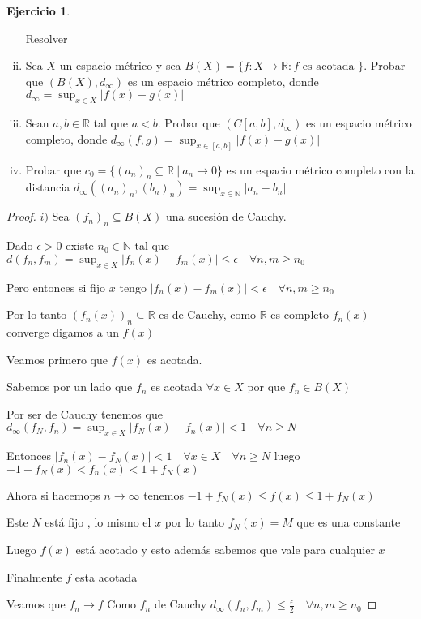 \documentclass[12pt]{article}
\newcommand{\R}{\mathbb{R}}
\newcommand{\N}{\mathbb{N}}
\newcommand{\ra}{\rightarrow}
\theoremstyle{definition}
\newtheorem{ej}{Ejercicio}
\begin{document}
\begin{ej}
  \begin{enumerate}[i.] Resolver
    \item Sea $X$ un espacio métrico y sea $B(X) = \{f: X \ra \R : f \text{ es acotada }\}$. Probar que $(B(X),d_{\infty})$ es un espacio métrico completo, donde $d_{\infty} = \sup_{x \in X} |f(x) - g(x)|$ 
    \item Sean $a,b \in \R$ tal que $a<b$. Probar que $(C[a,b],d_{\infty})$ es un espacio métrico completo, donde $d_{\infty}(f,g) = \sup_{x \in [a,b]} |f(x) - g(x)|$ 
    \item Probar que $c_0 = \{(a_n)_n \subseteq \R \ | \ a_n \ra 0\}$ es un espacio métrico completo con la distancia $d_{\infty}( (a_n)_n,(b_n)_n) = \sup_{x \in \N}|a_n -b_n| $
  \end{enumerate}
  \begin{proof}
  $i)$ Sea $(f_n)_n \subseteq B(X)$ una sucesión de Cauchy. 
 
  Dado $\epsilon >0 $ existe $n_0 \in \N$ tal que $d(f_n,f_m) =\sup_{x \in X} |f_n(x) - f_m(x)| \leq \epsilon \quad \forall n,m \geq n_0$ 

	  Pero entonces si fijo $x$ tengo $|f_n(x) - f_m(x)| < \epsilon \quad \forall n,m \geq n_0$ 

	  Por lo tanto $(f_n(x))_n \subseteq \R$ es de Cauchy, como $\R$ es completo $f_n(x)$ converge digamos a un $f(x)$

	  Veamos primero que $f(x)$ es acotada.

	  Sabemos por un lado que $f_n$ es acotada $\forall x \in X$ por que $f_n \in B(X)$

	  Por ser de Cauchy tenemos que $d_{\infty}(f_N,f_n)=\sup_{x \in X}|f_N(x) - f_n(x)| < 1 \quad \forall n \geq N$ 

	Entonces $|f_n(x) - f_N(x)| < 1 \quad \forall x \in X \quad \forall n \geq N $ luego $-1 +f_N(x) < f_n(x) < 1 +f_N(x)$

	  Ahora si hacemops $n \ra \infty$ tenemos $-1 + f_N(x) \leq f(x) \leq 1 + f_N(x)$

	  Este $N$ está fijo , lo mismo el $x$ por lo tanto $f_N(x) = M$ que es una constante

	  Luego $f(x)$ está acotado y esto además sabemos que vale para cualquier $x$  

	  Finalmente $f$ esta acotada

	  Veamos que $f_n \ra f$ Como $f_n$ de Cauchy $d_{\infty}(f_n,f_m) \leq \frac{\epsilon}{2} \quad \forall n,m \geq n_0$


\end{proof}
\end{ej}
\end{document}
